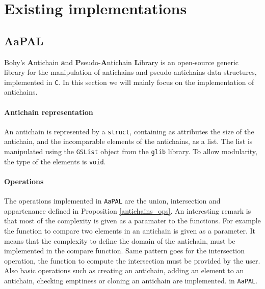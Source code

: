 \documentclass[letterpaper]{article}
\theoremstyle{definition}
\begin{document}
\newpage


\section{Existing implementations}

\label{impl}

\subsection{AaPAL}

Bohy's \textbf{A}ntichain
\textbf{a}nd \textbf{P}seudo-\textbf{A}ntichain \textbf{L}ibrary \cite{aapal}
is an open-source generic library for the manipulation
of antichains and pseudo-antichains data structures,
implemented in \texttt{C}. In this section we will mainly focus
on the implementation of antichains.


\paragraph{Antichain representation}

An antichain is represented by a \texttt{struct}, containing as attributes
the size of the antichain, and the incomparable elements of the antichains,
as a list. The list is manipulated using the \texttt{GSList} object
from the \texttt{glib} library.
To allow modularity, the type of the elements
is \texttt{void}.

\paragraph{Operations}

The operations implemented in \texttt{AaPAL}
are the union, intersection and appartenance
defined in Proposition \ref{antichains_ops}.
An interesting remark is that most of the complexity is given as a paramater
to the functions. For example the function to compare two elements in
an antichain is given as a parameter. It means that the complexity to define
the domain of the antichain, must be implemented in the compare function.
Same pattern goes for the intersection operation,
the function to compute the intersection must be provided by the user.
Also basic
operations such as creating an antichain,
adding an element to
an antichain, checking emptiness or cloning an antichain are implemented.
in \texttt{AaPAL}.
\end{document}
